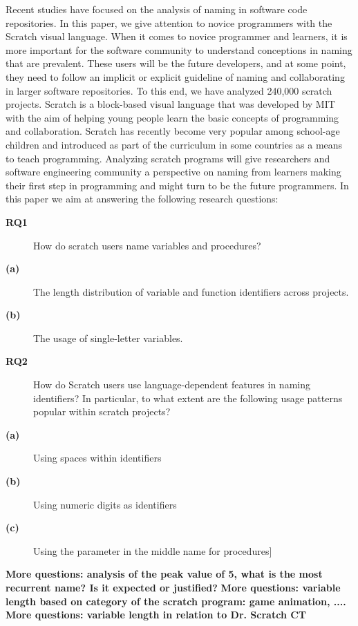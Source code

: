 \documentclass[conference]{IEEEtran}
\newcommand{\todo}[1]{ \textbf{#1} }
\begin{document}
Recent studies have focused on the analysis of naming in software code repositories. In this paper, we give attention to novice programmers with the Scratch visual language. 
When it comes to novice programmer and learners, it is more important for the software community to understand conceptions in naming that are prevalent. These users will be the future developers, and at some point, they need to follow an implicit or explicit guideline of naming and collaborating in larger software repositories. 
To this end, we have analyzed 240,000 scratch projects. Scratch is a block-based visual language that was developed by MIT with the aim of helping young people learn the basic concepts of programming and collaboration. Scratch has recently become very popular among school-age children and introduced as part of the curriculum in some countries as a means to teach programming. Analyzing scratch programs will give researchers and software engineering community a perspective on naming from learners making their first step in programming and might turn to be the future programmers. In this paper we aim at answering the following research questions: \\
\begin{description}
	\item[\textbf{RQ1}] How do scratch users name variables and procedures?
	\item[\textbf{(a)}] The length distribution of variable and function identifiers across projects.
	\item[\textbf{(b)}] The usage of single-letter variables.
	\item[\textbf{RQ2}] How do Scratch users use language-dependent features in naming identifiers? In particular, to what extent are the following usage patterns popular within scratch projects?
	\item[\textbf{(a)}] Using spaces within identifiers
	\item[\textbf{(b)}] Using numeric digits as identifiers
	\item[\textbf{(c)}] Using the parameter in the middle name for procedures] 
	
\end{description}

\todo{More questions: analysis of the peak value of 5, what is the most recurrent name? Is it expected or justified?}
\todo{More questions: variable length based on category of the scratch program: game animation, ....}
\todo{More questions: variable length in relation to Dr. Scratch CT}
 
\end{document}
